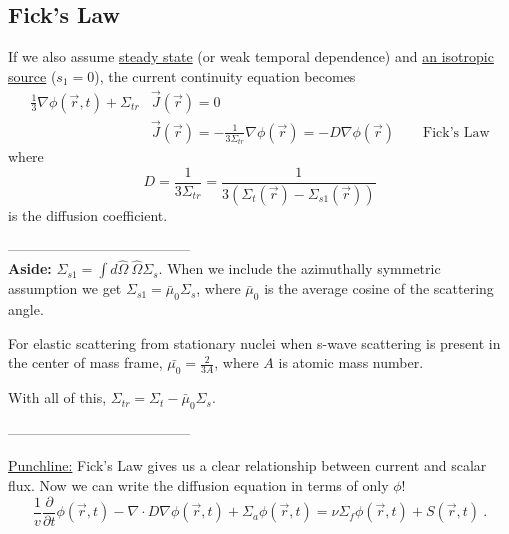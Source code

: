 \documentclass[12pt]{article}
\newlength{\up}
\newcommand{\Macro}{\ensuremath{\Sigma}}
\newcommand{\vOmega}{\ensuremath{\hat{\Omega}}}
\begin{document}
\subsection*{Fick's Law}
If we also assume \underline{steady state} (or weak temporal dependence) and \underline{an isotropic source} ($s_1 = 0$), the current continuity equation becomes
%
\begin{align*}
\frac{1}{3} \nabla \phi(\vec{r}, t) +
\Sigma_{tr}  &\vec{J}(\vec{r}) = 0 \\
&\boxed{\vec{J}(\vec{r}) = -\frac{1}{3\Sigma_{tr}} \nabla \phi(\vec{r}) = -D\nabla \phi(\vec{r}) } \qquad \text{Fick's Law}
\end{align*}
%
where
\[D = \frac{1}{3\Macro_{tr}} = \frac{1}{3(\Macro_t(\vec{r}) - \Macro_{s1}(\vec{r}))}\] 
is the diffusion coefficient. 

 ---------------------------------------\\
\textbf{Aside:} $\Macro_{s1}  = \int d\vOmega \:\vOmega \Macro_{s}$. When we include the azimuthally symmetric assumption we get $\Macro_{s1} = \bar{\mu}_{0}\Macro_{s}$, where $\bar{\mu}_{0}$ is the average cosine of the scattering angle.

For elastic scattering from stationary nuclei when s-wave scattering is present in the center of mass frame, $\bar{\mu_{0}} = \frac{2}{3A}$, where $A$ is atomic mass number. 

With all of this, $\Sigma_{tr} = \Sigma_t - \bar{\mu}_0 \Sigma_s$.

%
 ---------------------------------------

\underline{Punchline:} Fick's Law gives us a clear relationship between current and scalar flux. Now we can write the diffusion equation in terms of only $\phi$!
%
\begin{equation}
\boxed{\frac{1}{v}\frac{\partial}{\partial t}\phi(\vec{r}, t) 
-\nabla \cdot D\nabla \phi(\vec{r}, t) + 
\Sigma_a \phi(\vec{r}, t) =
\nu \Sigma_f \phi(\vec{r}, t) +
S(\vec{r}, t)} \:. \nonumber
\end{equation}
\end{document}
